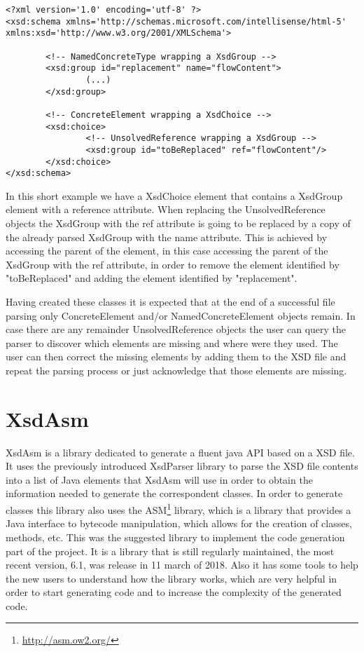 
\begin{minipage}{\linewidth}
\begin{lstlisting}[caption={Reference Solving Example},captionpos=b]
<?xml version='1.0' encoding='utf-8' ?>
<xsd:schema xmlns='http://schemas.microsoft.com/intellisense/html-5' xmlns:xsd='http://www.w3.org/2001/XMLSchema'>
	
		<!-- NamedConcreteType wrapping a XsdGroup -->
		<xsd:group id="replacement" name="flowContent">
				(...)
		</xsd:group>
	
		<!-- ConcreteElement wrapping a XsdChoice -->
		<xsd:choice>
				<!-- UnsolvedReference wrapping a XsdGroup -->
				<xsd:group id="toBeReplaced" ref="flowContent"/>
		</xsd:choice>
</xsd:schema>
\end{lstlisting}
\end{minipage}

\noindent
In this short example we have a XsdChoice element that contains a XsdGroup element with a reference attribute. When replacing the UnsolvedReference objects the XsdGroup with the ref attribute is going to be replaced by a copy of the already parsed XsdGroup with the name attribute. This is achieved by accessing the parent of the element, in this case accessing the parent of the XsdGroup with the ref attribute, in order to remove the element identified by "toBeReplaced" and adding the element identified by "replacement".

\noindent
Having created these classes it is expected that at the end of a successful file parsing only ConcreteElement and/or NamedConcreteElement objects remain. In case there are any remainder UnsolvedReference objects the user can query the parser to discover which elements are missing and where were they used. The user can then correct the missing elements by adding them to the \ac{XSD} file and repeat the parsing process or just acknowledge that those elements are missing. 

\section{XsdAsm} %
\label{sec:xsdasm}

XsdAsm is a library dedicated to generate a fluent java API based on a XSD file. It uses the previously introduced XsdParser library to parse the \ac{XSD} file contents into a list of Java elements that XsdAsm will use in order to obtain the information needed to generate the correspondent classes. In order to generate classes this library also uses the ASM\footnote{\url{http://asm.ow2.org/}} library, which is a library that provides a Java interface to bytecode manipulation, which allows for the creation of classes, methods, etc. This was the suggested library to implement the code generation part of the project. It is a library that is still regularly maintained, the most recent version, 6.1, was release in 11 march of 2018. Also it has some tools to help the new users to understand how the library works, which are very helpful in order to start generating code and to increase the complexity of the generated code.

